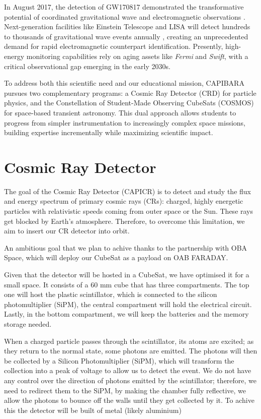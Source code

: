 \documentclass[11pt]{article}
\begin{document}
In August 2017, the detection of GW170817 demonstrated the transformative potential of coordinated gravitational wave and electromagnetic observations \cite{missing}. Next-generation facilities like Einstein Telescope and LISA will detect hundreds to thousands of gravitational wave events annually \cite{missing}, creating an unprecedented demand for rapid electromagnetic counterpart identification. Presently, high-energy monitoring capabilities rely on aging assets like \textit{Fermi} and \textit{Swift}, with a critical observational gap emerging in the early 2030s.

To address both this scientific need and our educational mission, CAPIBARA pursues two complementary programs: a Cosmic Ray Detector (CRD) for particle physics, and the Constellation of Student-Made Observing CubeSats (COSMOS) for space-based transient astronomy. This dual approach allows students to progress from simpler instrumentation to increasingly complex space missions, building expertise incrementally while maximizing scientific impact.

\section{Cosmic Ray Detector}

The goal of the Cosmic Ray Detector (CAPICR) is to detect and study the flux and energy spectrum of primary cosmic rays (CRs): charged, highly energetic particles with relativistic speeds coming from outer space or the Sun. These rays get blocked by Earth’s atmosphere. Therefore, to overcome this limitation, we aim to insert our CR detector into orbit.

An ambitious goal that we plan to achive thanks to the partnership with OBA Space, which will deploy our CubeSat as a payload on OAB FARADAY.

Given that the detector will be hosted in a CubeSat, we have optimised it for a small space. It consists of a 60 mm cube that has three compartments. The top one will host the plastic scintillator, which is connected to the silicon photomultiplier (SiPM), the central compartment will hold the electrical circuit. Lastly, in the bottom compartment, we will keep the batteries and the memory storage needed.

When a charged particle passes through the scintillator, its atoms are excited; as they return to the normal state, some photons are emitted. The photons will then be collected by a Silicon Photomultiplier (SiPM), which will transform the collection into a peak of voltage to allow us to detect the event. We do not have any control over the direction of photons emitted by the scintillator; therefore, we need to redirect them to the SiPM, by making the chamber fully reflective, we allow the photons to bounce off the walls until they get collected by it. To achive this the detector will be built of metal (likely aluminium)
\end{document}
